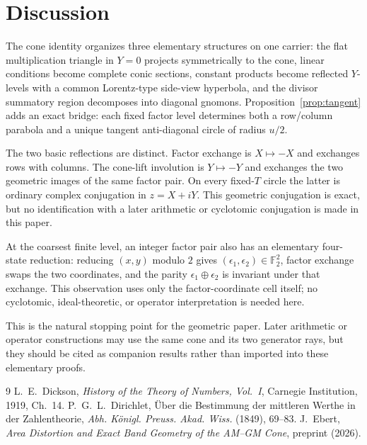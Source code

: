 \documentclass[11pt]{amsart}
\theoremstyle{remark}
\begin{document}
\section{Discussion}
The cone identity organizes three elementary structures on one carrier: the flat multiplication triangle in $Y=0$ projects symmetrically to the cone, linear conditions become complete conic sections, constant products become reflected $Y$-levels with a common Lorentz-type side-view hyperbola, and the divisor summatory region decomposes into diagonal gnomons. Proposition~\ref{prop:tangent} adds an exact bridge: each fixed factor level determines both a row/column parabola and a unique tangent anti-diagonal circle of radius $u/2$.

The two basic reflections are distinct. Factor exchange is $X\mapsto-X$ and exchanges rows with columns. The cone-lift involution is $Y\mapsto-Y$ and exchanges the two geometric images of the same factor pair. On every fixed-$T$ circle the latter is ordinary complex conjugation in $z=X+iY$. This geometric conjugation is exact, but no identification with a later arithmetic or cyclotomic conjugation is made in this paper.

At the coarsest finite level, an integer factor pair also has an elementary four-state reduction: reducing $(x,y)$ modulo $2$ gives $(\epsilon_1,\epsilon_2)\in\mathbb F_2^2$, factor exchange swaps the two coordinates, and the parity $\epsilon_1\oplus\epsilon_2$ is invariant under that exchange. This observation uses only the factor-coordinate cell itself; no cyclotomic, ideal-theoretic, or operator interpretation is needed here.

This is the natural stopping point for the geometric paper. Later arithmetic or operator constructions may use the same cone and its two generator rays, but they should be cited as companion results rather than imported into these elementary proofs.

\begin{thebibliography}{9}
 L.~E.~Dickson, \emph{History of the Theory of Numbers, Vol.~I}, Carnegie Institution, 1919, Ch.~14.
 P.~G.~L.~Dirichlet, \"Uber die Bestimmung der mittleren Werthe in der Zahlentheorie, \emph{Abh. K\"onigl. Preuss. Akad. Wiss.} (1849), 69--83.
 J.~Ebert, \emph{Area Distortion and Exact Band Geometry of the AM--GM Cone}, preprint (2026).
\end{thebibliography}
\end{document}
